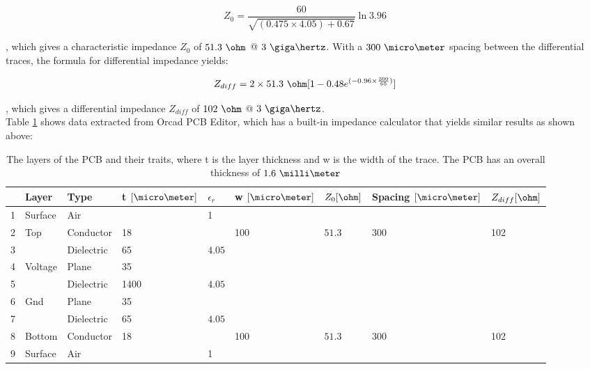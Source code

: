 \documentclass[main.tex]{subfiles}
\begin{document}
\begin{equation}
Z_0 = \frac{60}{\sqrt{(0.475 \times 4.05) + 0.67}}\ln{3.96}
\end{equation}

, which gives a characteristic impedance $Z_0$ of $51.3\ \ohm$ @ $3\ \giga\hertz$. With a $300\ \micro\meter$ spacing between the differential traces, the formula for differential impedance yields:

\begin{equation}
    Z_{diff} = 2 \times 51.3\ \ohm [1 - 0.48 e^{(-0.96 \times \frac{300}{65})}]
  \label{eq:zdiff}
\end{equation}

, which gives a differential impedance $Z_{diff}$ of $102\ \ohm$ @ $3\ \giga\hertz$.\\

Table \ref{tab:Xsect1} shows data extracted from Orcad PCB Editor, which has a built-in impedance calculator that yields similar results as shown above:

\begin{table} [H]
\begin{center}
    \begin{tabular}{| l | l | l | l | l | l | l | l | l |}
    \hline
     & Layer & Type & t $[\micro\meter]$ & $\epsilon_r$ & w $[\micro\meter]$  & $Z_0 [\ohm]$ & Spacing $[\micro\meter]$  & $Z_{diff} [\ohm]$ \\ 
     \hline
    1 	  & Surface & Air 		 & 		& 1 	 & 	   & 					& 	  & \\ \hline
    2 	  & Top 	& Conductor  & 18 	&        & 100 & $51.3$             & 300 & 102\\ \hline
    3 	  &  		& Dielectric & 65 	& $4.05$ & 	   & 					& 	  & \\ \hline
    4 	  & Voltage & Plane 	 & 35 	&        & 	   & 					& 	  & \\ \hline
    5 	  &  		& Dielectric & 1400 & $4.05$ & 	   &					&	  & \\ \hline
    6 	  & Gnd 	& Plane 	 & 35 	&        & 	   & 					& 	  & \\ \hline
    7 	  &  		& Dielectric & 65 	& $4.05$ &     & 					& 	  & \\ \hline
    8 	  & Bottom 	& Conductor  & 18 	&        & 100 & $51.3$             & 300 & 102\\ \hline
    9 	  & Surface & Air 		 & 	  	& 1 	 & 	   & 					& 	  & \\ \hline
    \end{tabular}
     \caption{The layers of the PCB and their traits, where t is the layer thickness and w is the width of the trace. The PCB has an overall thickness of $1.6\ \milli\meter$}
	\label{tab:Xsect1}
\end{center}
\end{table}
\end{document}
